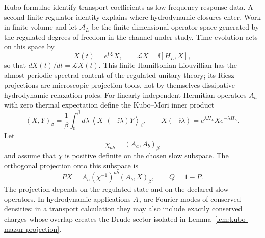 Kubo formulae identify transport coefficients as low-frequency response
data.  A second finite-regulator identity explains where hydrodynamic
closures enter.  Work in finite volume and let \(\mathcal A_L\) be the
finite-dimensional operator space generated by the regulated degrees of
freedom in the channel under study.  Time evolution acts on this space by
\[
  X(t)=e^{t\mathcal L}X,
  \qquad
  \mathcal L X=\ii[H_L,X],
\]
so that \(dX(t)/dt=\mathcal L X(t)\).  This finite Hamiltonian Liouvillian
has the almost-periodic spectral content of the regulated unitary theory; its
Riesz projections are microscopic projection tools, not by themselves
dissipative hydrodynamic relaxation poles.  For linearly independent Hermitian
operators \(A_a\) with zero thermal expectation define the Kubo--Mori inner
product
\begin{equation}
  (X,Y)_\beta
  =
  \frac1\beta\int_0^\beta d\lambda\,
  \left\langle
    X^\dagger(-\ii\lambda)Y
  \right\rangle_\beta,
  \qquad
  X(-\ii\lambda)=e^{\lambda H_L}Xe^{-\lambda H_L}.
  \label{eq:kubo-mori-inner-product}
\end{equation}
Let
\[
  \chi_{ab}=(A_a,A_b)_\beta
\]
and assume that \(\chi\) is positive definite on the chosen slow subspace.
The orthogonal projection onto this subspace is
\begin{equation}
  PX=A_a(\chi^{-1})^{ab}(A_b,X)_\beta,
  \qquad
  Q=1-P .
  \label{eq:kubo-mori-projection}
\end{equation}
The projection depends on the regulated state and on the declared slow
operators.  In hydrodynamic applications \(A_a\) are Fourier modes of
conserved densities; in a transport calculation they may also include
exactly conserved charges whose overlap creates the Drude sector isolated in
Lemma~\ref{lem:kubo-mazur-projection}.

